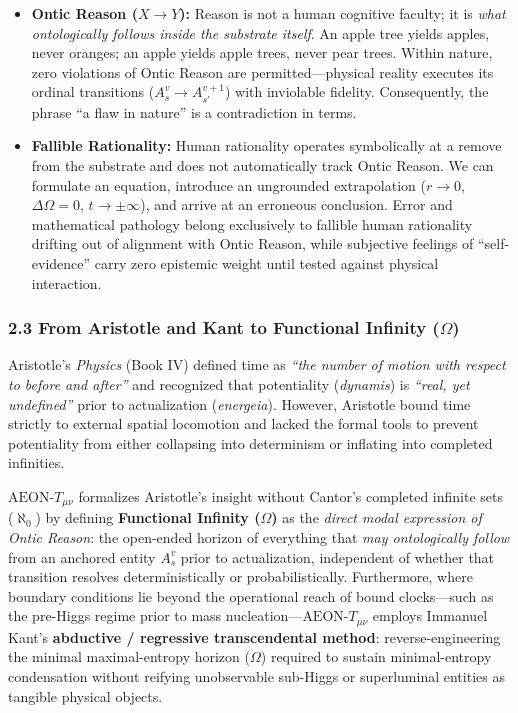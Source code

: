 \documentclass[
]{article}
\providecommand{\tightlist}{%
  \setlength{\itemsep}{0pt}\setlength{\parskip}{0pt}}
\begin{document}
\begin{itemize}
\tightlist
\item
  \textbf{Ontic Reason (\(X \to Y\)):} Reason is not a human cognitive
  faculty; it is \emph{what ontologically follows inside the substrate
  itself}. An apple tree yields apples, never oranges; an apple yields
  apple trees, never pear trees. Within nature, zero violations of Ontic
  Reason are permitted---physical reality executes its ordinal
  transitions (\(A_s^v \to A_{s'}^{v+1}\)) with inviolable fidelity.
  Consequently, the phrase ``a flaw in nature'' is a contradiction in
  terms.
\item
  \textbf{Fallible Rationality:} Human rationality operates symbolically
  at a remove from the substrate and does not automatically track Ontic
  Reason. We can formulate an equation, introduce an ungrounded
  extrapolation (\(r \to 0\), \(\Delta\Omega = 0\),
  \(t \to \pm\infty\)), and arrive at an erroneous conclusion. Error and
  mathematical pathology belong exclusively to fallible human
  rationality drifting out of alignment with Ontic Reason, while
  subjective feelings of ``self-evidence'' carry zero epistemic weight
  until tested against physical interaction.
\end{itemize}

\subsubsection{\texorpdfstring{2.3 From Aristotle and Kant to Functional
Infinity
(\(\Omega\))}{2.3 From Aristotle and Kant to Functional Infinity (\textbackslash Omega)}}\label{from-aristotle-and-kant-to-functional-infinity-omega}

Aristotle's \emph{Physics} (Book IV) defined time as \emph{``the number
of motion with respect to before and after''} and recognized that
potentiality (\emph{dynamis}) is \emph{``real, yet undefined''} prior to
actualization (\emph{energeia}). However, Aristotle bound time strictly
to external spatial locomotion and lacked the formal tools to prevent
potentiality from either collapsing into determinism or inflating into
completed infinities.

\(\text{AEON-}T_{\mu\nu}\) formalizes Aristotle's insight without
Cantor's completed infinite sets (\(\aleph_0\)) by defining
\textbf{Functional Infinity (\(\Omega\))} as the \emph{direct modal
expression of Ontic Reason}: the open-ended horizon of everything that
\emph{may ontologically follow} from an anchored entity \(A_s^v\) prior
to actualization, independent of whether that transition resolves
deterministically or probabilistically. Furthermore, where boundary
conditions lie beyond the operational reach of bound clocks---such as
the pre-Higgs regime prior to mass
nucleation---\(\text{AEON-}T_{\mu\nu}\) employs Immanuel Kant's
\textbf{abductive / regressive transcendental method}:
reverse-engineering the minimal maximal-entropy horizon (\(\Omega\))
required to sustain minimal-entropy condensation without reifying
unobservable sub-Higgs or superluminal entities as tangible physical
objects.
\end{document}
